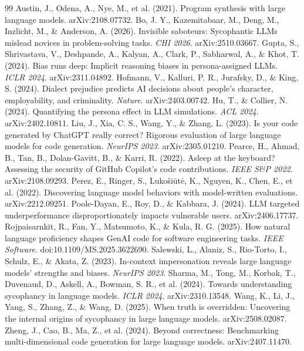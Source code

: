 \documentclass[11pt,a4paper]{article}
\begin{document}
\begin{thebibliography}{99}\small
{} Austin, J., Odena, A., Nye, M., et al. (2021). Program synthesis with large language models. arXiv:2108.07732.
 Bo, J. Y., Kazemitabaar, M., Deng, M., Inzlicht, M., \& Anderson, A. (2026). Invisible saboteurs: Sycophantic LLMs mislead novices in problem-solving tasks. \emph{CHI 2026}. arXiv:2510.03667.
 Gupta, S., Shrivastava, V., Deshpande, A., Kalyan, A., Clark, P., Sabharwal, A., \& Khot, T. (2024). Bias runs deep: Implicit reasoning biases in persona-assigned LLMs. \emph{ICLR 2024}. arXiv:2311.04892.
 Hofmann, V., Kalluri, P. R., Jurafsky, D., \& King, S. (2024). Dialect prejudice predicts AI decisions about people's character, employability, and criminality. \emph{Nature}. arXiv:2403.00742.
 Hu, T., \& Collier, N. (2024). Quantifying the persona effect in LLM simulations. \emph{ACL 2024}. arXiv:2402.10811.
 Liu, J., Xia, C. S., Wang, Y., \& Zhang, L. (2023). Is your code generated by ChatGPT really correct? Rigorous evaluation of large language models for code generation. \emph{NeurIPS 2023}. arXiv:2305.01210.
 Pearce, H., Ahmad, B., Tan, B., Dolan-Gavitt, B., \& Karri, R. (2022). Asleep at the keyboard? Assessing the security of GitHub Copilot's code contributions. \emph{IEEE S\&P 2022}. arXiv:2108.09293.
 Perez, E., Ringer, S., Lukošiūtė, K., Nguyen, K., Chen, E., et al. (2022). Discovering language model behaviors with model-written evaluations. arXiv:2212.09251.
 Poole-Dayan, E., Roy, D., \& Kabbara, J. (2024). LLM targeted underperformance disproportionately impacts vulnerable users. arXiv:2406.17737.
 Rojpaisarnkit, R., Fan, Y., Matsumoto, K., \& Kula, R. G. (2025). How natural language proficiency shapes GenAI code for software engineering tasks. \emph{IEEE Software}. doi:10.1109/MS.2025.3622690.
 Salewski, L., Alaniz, S., Rio-Torto, I., Schulz, E., \& Akata, Z. (2023). In-context impersonation reveals large language models' strengths and biases. \emph{NeurIPS 2023}.
 Sharma, M., Tong, M., Korbak, T., Duvenaud, D., Askell, A., Bowman, S. R., et al. (2024). Towards understanding sycophancy in language models. \emph{ICLR 2024}. arXiv:2310.13548.
 Wang, K., Li, J., Yang, S., Zhang, Z., \& Wang, D. (2025). When truth is overridden: Uncovering the internal origins of sycophancy in large language models. arXiv:2508.02087.
 Zheng, J., Cao, B., Ma, Z., et al. (2024). Beyond correctness: Benchmarking multi-dimensional code generation for large language models. arXiv:2407.11470.
\end{thebibliography}
\end{document}
